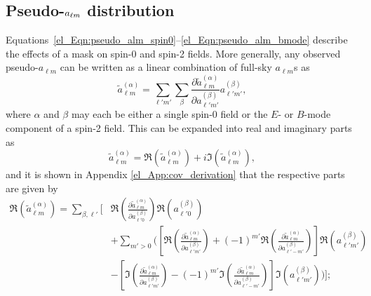 \subsection{Pseudo-\texorpdfstring{$a_{\ell m}$}{alm} distribution}

Equations~\eqref{el_Eqn:pseudo_alm_spin0}--\eqref{el_Eqn:pseudo_alm_bmode} describe the effects of a mask on spin-0 and spin-2 fields. More generally, any observed pseudo-$a_{\ell m}$ can be written as a linear combination of full-sky $a_{\ell m}$s as
\begin{equation}
    \widetilde{a}_{\ell m}^{\left( \alpha \right)} = \sum_{\ell' m'} \sum_\beta
    \frac{\partial \widetilde{a}_{\ell m}^{\left( \alpha \right)}}
    {\partial a_{\ell' m'}^{\left( \beta \right)}}
    a_{\ell' m'}^{\left( \beta \right)},
\label{el_Eqn:pseudo_alm_as_sum}
\end{equation}
where $\alpha$ and $\beta$ may each be either a single spin-0 field or the $E$- or $B$-mode component of a spin-2 field. This can be expanded into real and imaginary parts as
\begin{equation}
\widetilde{a}_{\ell m}^{\left( \alpha \right)} =
\Re \left( \widetilde{a}_{\ell m}^{\left( \alpha \right)} \right)
+ i
\Im \left( \widetilde{a}_{\ell m}^{\left( \alpha \right)} \right),
\end{equation}
and it is shown in
Appendix \ref{el_App:cov_derivation}
that the respective parts are given by
\begin{equation}
\begin{split}
\Re \left( \widetilde{a}_{\ell m}^{ \left( \alpha \right) } \right) =
\sum_{\beta, \ell'} \Bigg[ &
\Re \left(
\frac{\partial \widetilde{a}_{\ell m}^{ \left( \alpha \right) }}
{\partial a_{\ell' 0}^{ \left( \beta \right) }}
\right)
\Re \left( a_{\ell' 0}^{ \left( \beta \right) } \right) \\
& +
\sum_{m' > 0} \Bigg( \left[
\Re \left(
\frac{\partial \widetilde{a}_{\ell m}^{ \left( \alpha \right) }}
{\partial a_{\ell' m'}^{ \left( \beta \right) }}
\right)
+ \left( -1 \right)^{m'}
\Re \left(
\frac{\partial \widetilde{a}_{\ell m}^{ \left( \alpha \right) }}
{\partial a_{\ell' -m'}^{ \left( \beta \right) }}
\right) \right]
\Re \left(
a_{\ell' m'}^{ \left( \beta \right) }
\right) \\
& -
\left[ \Im \left(
\frac{\partial \widetilde{a}_{\ell m}^{ \left( \alpha \right) }}
{\partial a_{\ell' m'}^{ \left( \beta \right) }}
\right)
- \left( -1 \right)^{m'}
\Im \left(
\frac{\partial \widetilde{a}_{\ell m}^{ \left( \alpha \right) }}
{\partial a_{\ell' -m'}^{ \left( \beta \right) }}
\right) \right]
\Im \left(
a_{\ell' m'}^{ \left( \beta \right) }
\right) \Bigg) \Bigg];
\label{el_Eqn:Re_alm_general}
\end{split}
\end{equation}
